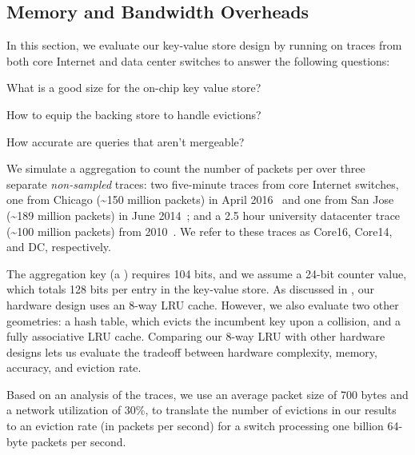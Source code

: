 \subsection{Memory and Bandwidth Overheads}
\label{s:eval:traces}
\label{sec:eval:traces}


In this section, we evaluate our key-value store design by running \TheSystem on
traces from both core Internet and data center switches to answer the following
questions:
\begin{CompactEnumerate}
\item What is a good size for the on-chip key value store?
\item How to equip the backing store to handle evictions?
\item How accurate are queries that aren't mergeable?
\end{CompactEnumerate}

  We simulate a \TheSystem aggregation to count the number of
packets per \txtftuple over three separate {\em non-sampled} traces: two
five-minute traces from core Internet switches, one from Chicago
(\textasciitilde{}150 million packets) in April 2016~\cite{caida2016} and one
from San Jose (\textasciitilde{}189 million packets) in June
2014~\cite{caida2014}; and a 2.5 hour university datacenter trace
(\textasciitilde{}100 million packets) from 2010~\cite{bensonDC}. We refer to
these traces as Core16, Core14, and DC, respectively.

The aggregation key (a \txtftuple) requires 104 bits, and we assume a 24-bit
counter value, which totals 128 bits per entry in the key-value store. As
discussed in , our hardware design uses an 8-way LRU
cache. However, we also evaluate two other geometries: a hash table, which
evicts the incumbent key upon a collision, and a fully associative LRU
cache. Comparing our 8-way LRU with other hardware designs lets us evaluate the
tradeoff between hardware complexity, memory, accuracy, and eviction rate.

Based on an analysis of the traces, we use an average packet size of 700 bytes
and a network utilization of 30\%, to translate the number of evictions in our
results to an eviction rate (in packets per second) for a switch processing one
billion 64-byte packets per second.

